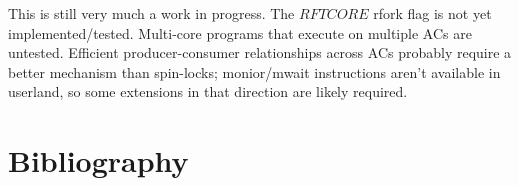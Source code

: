 \documentclass{article}
\begin{document}
This is still very much a work in progress.
The $RFTCORE$ rfork flag is not yet implemented/tested.
Multi-core programs that execute on multiple ACs are untested.
Efficient producer-consumer relationships across ACs probably require a better mechanism than spin-locks; monior/mwait instructions aren't available in userland, so some extensions in that direction are likely required.

\section{Bibliography}


\end{document}
